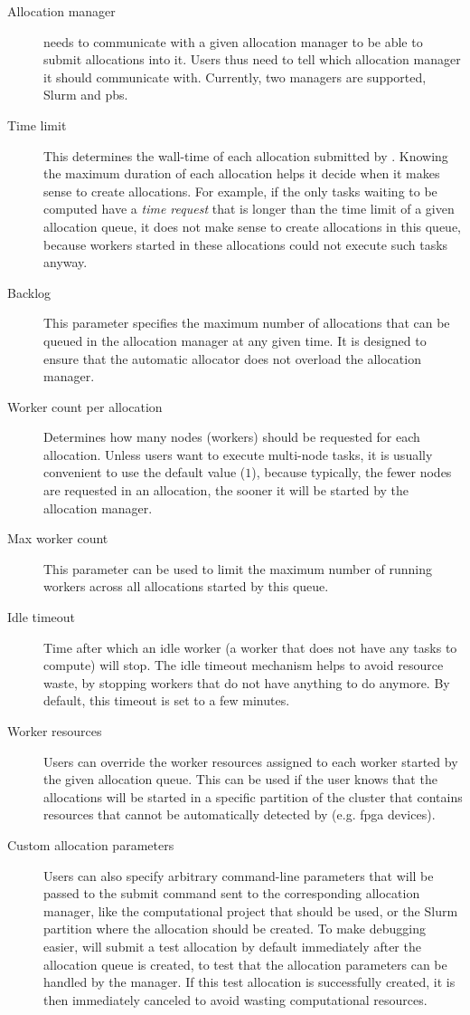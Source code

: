 \begin{description}
	\item[Allocation manager] \Autoalloc{} needs to communicate with a given allocation manager
		to be able to submit allocations into it. Users thus need to tell \hq{} which
		allocation manager it should communicate with. Currently, two managers are supported, Slurm and
		\gls{pbs}.
	\item[Time limit] This determines the wall-time of each allocation submitted by \autoalloc{}. Knowing the
		maximum duration of each allocation helps it decide when it makes sense to create allocations. For
		example, if the only tasks waiting to be computed have a \emph{time request} that is longer
		than the time limit of a given allocation queue, it does not make sense to create allocations in
		this queue, because workers started in these allocations could not execute such tasks anyway.
	\item[Backlog] This parameter specifies the maximum number of allocations that can be queued in the allocation
		manager at any given time. It is designed to ensure that the automatic allocator does not overload
		the allocation manager.
	\item[Worker count per allocation] Determines how many nodes (workers) should be requested for each allocation. Unless users want to
		execute multi-node tasks, it is usually convenient to use the default value
		($1$), because typically, the fewer nodes are requested in an allocation, the
		sooner it will be started by the allocation manager.
	\item[Max worker count] This parameter can be used to limit the maximum number of running workers across all allocations
		started by this queue.
	\item[Idle timeout] Time after which an idle worker (a worker that does not have any tasks to compute) will stop. The
		idle timeout mechanism helps to avoid resource waste, by stopping workers that do not have anything
		to do anymore. By default, this timeout is set to a few minutes.
	\item[Worker resources] Users can override the worker resources assigned to each worker started by the given allocation
		queue. This can be used if the user knows that the allocations will be started in a specific
		partition of the cluster that contains resources that cannot be automatically detected by
		\hyperqueue{} (e.g. \gls{fpga} devices).
	\item[Custom allocation parameters] Users can also specify arbitrary command-line parameters that will be passed to the submit command
		sent to the corresponding allocation manager, like the computational project that should be used,
		or the Slurm partition where the allocation should be created. To make debugging easier,
		\hyperqueue{} will submit a test allocation by default immediately after the allocation
		queue is created, to test that the allocation parameters can be handled by the manager. If this
		test allocation is successfully created, it is then immediately canceled to avoid wasting
		computational resources.
\end{description}

